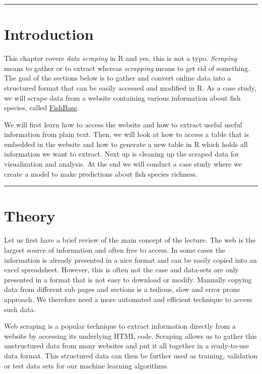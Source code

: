 \documentclass[
]{book}
\begin{document}
\begin{center}\rule{0.5\linewidth}{0.5pt}\end{center}

\hypertarget{introduction-1}{%
\section{Introduction}\label{introduction-1}}

This chapter covers \emph{data scraping} in R and yes, this is not a typo. \emph{Scraping} means to gather or to extract whereas \emph{scrapping} means to get rid of something. The goal of the sections below is to gather and convert online data into a structured format that can be easily accessed and modified in R. As a case study, we will scrape data from a website containing various information about fish species, called \href{https://www.fishbase.in/search.php}{FishBase}.

We will first learn how to access the website and how to extract useful useful information from plain text. Then, we will look at how to access a table that is embedded in the website and how to generate a new table in R which holds all information we want to extract. Next up is cleaning up the scraped data for visualization and analysis. At the end we will conduct a case study where we create a model to make predictions about fish species richness.

\begin{center}\rule{0.5\linewidth}{0.5pt}\end{center}

\hypertarget{theory}{%
\section{Theory}\label{theory}}

Let us first have a brief review of the main concept of the lecture. The web is the largest source of information and often free to access. In some cases the information is already presented in a nice format and can be easily copied into an excel spreadsheet. However, this is often not the case and data-sets are only presented in a format that is not easy to download or modify. Manually copying data from different sub pages and sections is a tedious, slow and error prone approach. We therefore need a more automated and efficient technique to access such data.

Web scraping is a popular technique to extract information directly from a website by accessing its underlying HTML code. Scraping allows us to gather this unstructured data from many websites and put it all together in a ready-to-use data format. This structured data can then be further used as training, validation or test data sets for our machine learning algorithms.
\end{document}
